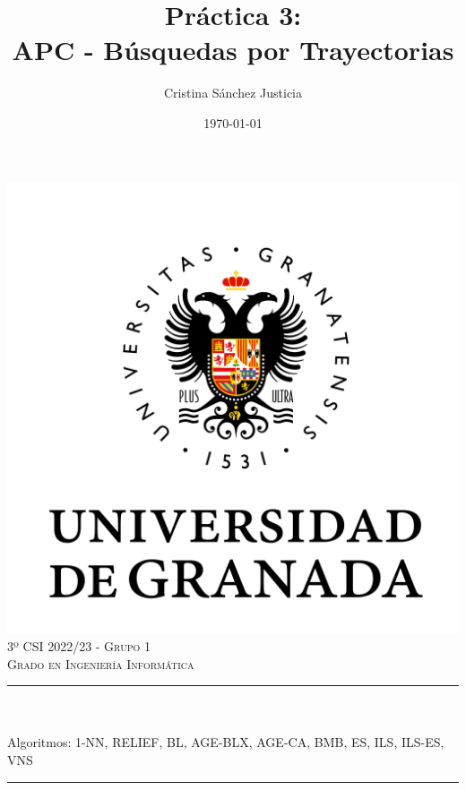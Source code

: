 \documentclass[12pt, spanish]{article}
\title{Práctica 3:\\
APC - Búsquedas por Trayectorias  \hspace{0.05cm} }
\author{Cristina Sánchez Justicia}
\date{\today}
\makeatletter
\let\thetitle\@title
\makeatother
\begin{document}

\begin{titlepage}
    \centering
    \vspace*{0.3 cm}
    \includegraphics[scale = 0.50]{ugr.png}\\[0.7 cm]
    \textsc{\large 3º CSI 2022/23 - Grupo 1}\\[0.5 cm]                \textsc{\large Grado en Ingeniería Informática}\\[0.5 cm]              
    \rule{\linewidth}{0.2 mm} \\[0.2 cm]
    { \huge \bfseries \thetitle}\\
	Algoritmos: 
	1-NN, RELIEF, BL, AGE-BLX, AGE-CA, BMB, ES, ILS, ILS-ES, VNS \\
    \rule{\linewidth}{0.2 mm} \\[1 cm]
    

\end{titlepage}
\end{document}
